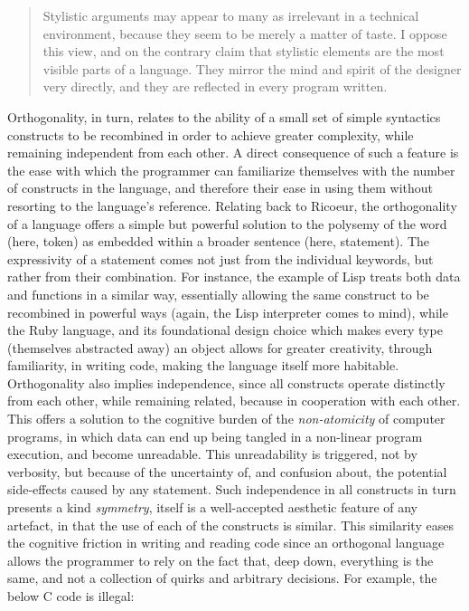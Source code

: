 \begin{quote}
  Stylistic arguments may appear to many as irrelevant in a technical environment, because they seem to be merely a matter of taste. I oppose this view, and on the contrary claim that stylistic elements are the most visible parts of a language. They mirror the mind and spirit of the designer very directly, and they are reflected in every program written.\citep{wirth_essence_2003}
\end{quote}

Orthogonality, in turn, relates to the ability of a small set of simple syntactics constructs to be recombined in order to achieve greater complexity, while remaining independent from each other. A direct consequence of such a feature is the ease with which the programmer can familiarize themselves with the number of constructs in the language, and therefore their ease in using them without resorting to the language's reference. Relating back to Ricoeur, the orthogonality of a language offers a simple but powerful solution to the polysemy of the word (here, token) as embedded within a broader sentence (here, statement). The expressivity of a statement comes not just from the individual keywords, but rather from their combination. For instance, the example of Lisp treats both data and functions in a similar way, essentially allowing the same construct to be recombined in powerful ways (again, the Lisp interpreter comes to mind), while the Ruby language, and its foundational design choice which makes every type (themselves abstracted away) an object allows for greater creativity, through familiarity, in writing code, making the language itself more habitable. Orthogonality also implies independence, since all constructs operate distinctly from each other, while remaining related, because in cooperation with each other. This offers a solution to the cognitive burden of the \emph{non-atomicity} of computer programs, in which data can end up being tangled in a non-linear program execution, and become unreadable. This unreadability is triggered, not by verbosity, but because of the uncertainty of, and confusion about, the potential side-effects caused by any statement. Such independence in all constructs in turn presents a kind \emph{symmetry}, itself is a well-accepted aesthetic feature of any artefact, in that the use of each of the constructs is similar. This similarity eases the cognitive friction in writing and reading code since an orthogonal language allows the programmer to rely on the fact that, deep down, everything is the same, and not a collection of quirks and arbitrary decisions. For example, the below C code is illegal:

